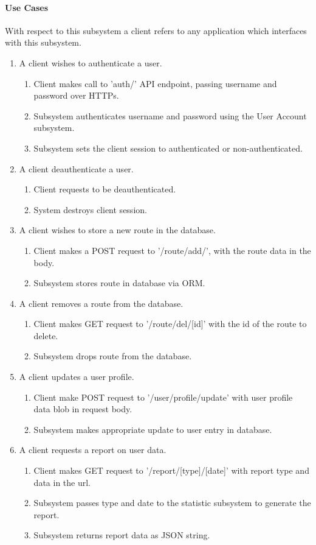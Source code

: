 ﻿\documentclass{article}
\begin{document}
\paragraph{Use Cases}
With respect to this subsystem a client refers to any application which interfaces with this subsystem.
\begin{enumerate}
\item A client wishes to authenticate a user.
    \begin{enumerate}
        \item Client makes call to 'auth/' API endpoint, passing username and password over HTTPs.
        \item Subsystem authenticates username and password using the User Account subsystem.
        \item Subsystem sets the client session to authenticated or non-authenticated.
    \end{enumerate}
\item A client deauthenticate a user.
    \begin{enumerate}
        \item Client requests to be deauthenticated.
        \item System destroys client session.
    \end{enumerate}
\item A client wishes to store a new route in the database.
    \begin{enumerate}
        \item Client makes a POST request to '/route/add/', with the route data in the body.
        \item Subsystem stores route in database via ORM.
    \end{enumerate}
\item A client removes a route from the database.
    \begin{enumerate}
        \item Client makes GET request to '/route/del/[id]' with the id of the route to delete.
        \item Subsystem drops route from the database.
    \end{enumerate}
\item A client updates a user profile.
    \begin{enumerate}
        \item Client make POST request to '/user/profile/update' with user profile data blob in request body.
        \item Subsystem makes appropriate update to user entry in database.
    \end{enumerate}
\item A client requests a report on user data.
    \begin{enumerate}
        \item Client makes GET request to '/report/[type]/[date]' with report type and data in the url.
        \item Subsystem passes type and date to the statistic subsystem to generate the report.
        \item Subsystem returns report data as JSON string.
    \end{enumerate}
\end{enumerate}
\end{document}
